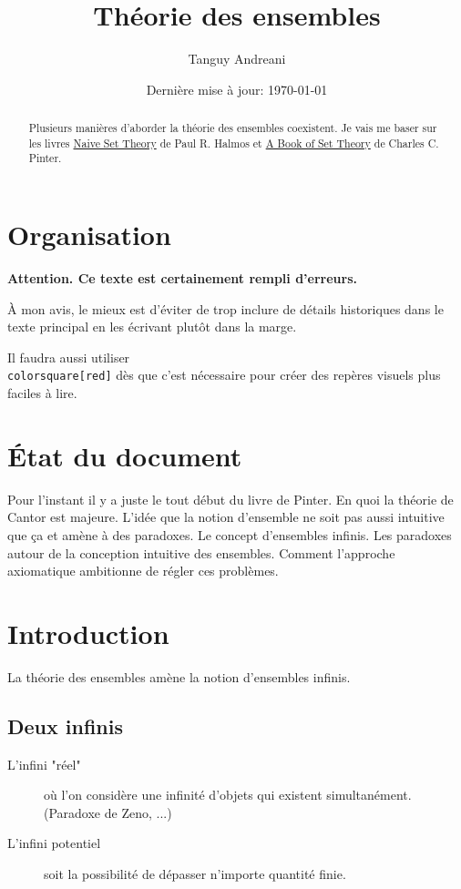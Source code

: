 \documentclass[fleqn,a4paper,nobib]{tufte-handout}
\title{Théorie des ensembles}
\author{Tanguy Andreani}
\date{Dernière mise à jour: \today}
\begin{document}
\maketitle

\begin{abstract}
    Plusieurs manières d'aborder la théorie des ensembles 
    coexistent. Je vais me baser sur les livres \underline{Naive
    Set Theory} de Paul R. Halmos et \underline{A Book of Set
    Theory} de Charles C. Pinter.
\end{abstract}

\tableofcontents

\section*{Organisation}

\textbf{Attention. Ce texte est certainement rempli d'erreurs.}

À mon avis, le mieux est d'éviter de trop inclure de
détails historiques dans le texte principal en les écrivant
plutôt dans la marge.

Il faudra aussi utiliser \texttt{\\colorsquare[red]} dès
que c'est nécessaire pour créer des repères visuels plus
faciles à lire.

\section*{État du document}

Pour l'instant il y a juste le tout début du livre de Pinter.
En quoi la théorie de Cantor est majeure. L'idée que la
notion d'ensemble ne soit pas aussi intuitive que ça et
amène à des paradoxes.
Le concept d'ensembles infinis. Les paradoxes autour de la
conception intuitive des ensembles.
Comment l'approche axiomatique ambitionne de régler ces
problèmes.

\section{Introduction}

La théorie des ensembles amène la notion d'ensembles infinis.

\subsection{Deux infinis}

\begin{description}
    \item[L'infini "réel"] où l'on considère une infinité
    d'objets qui existent simultanément. (Paradoxe de Zeno,
    ...)
    \item[L'infini potentiel] soit la possibilité de
    dépasser n'importe quantité finie.
\end{description}
\end{document}
